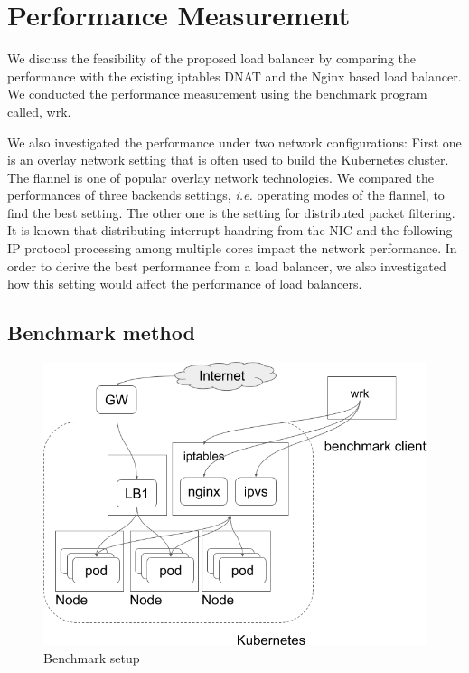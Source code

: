 \section{Performance Measurement}\label{Performance Measurement}


We discuss the feasibility of the proposed load balancer by comparing the performance with the existing iptables DNAT and the Nginx based load balancer. 
We conducted the performance measurement using the benchmark program called, wrk\cite{Glozer2016}.

We also investigated the performance under two network configurations: 
First one is an overlay network setting\cite{Sill2016,Marmol2015} that is often used to build the Kubernetes cluster. 
The flannel\cite{CoreOSFlannel} is one of popular overlay network technologies. 
We compared the performances of three backends settings\cite{CoreOSFlannelBackend}, 
{\it i.e.} operating modes of the flannel, to find the best setting.
The other one is the setting for distributed packet filtering.
It is known that distributing interrupt handring from the NIC and the following IP protocol processing 
among multiple cores impact the network performance.
In order to derive the best performance from a load balancer, 
we also investigated how this setting would affect the performance of load balancers.


\subsection{Benchmark method}

\begin{figure}
\includegraphics[width=\columnwidth]{Figs/benchmark-schem}
\caption{Benchmark setup}
\label{fig:benchmark-schem}
\end{figure}

